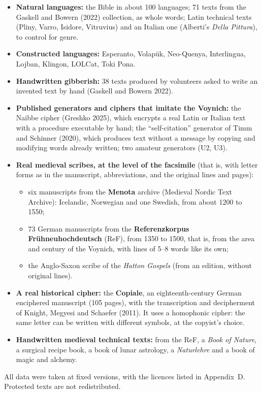 \begin{itemize}
\item \textbf{Natural languages:} the Bible in about 100 languages; 71 texts from the Gaskell and Bowern (2022)
  collection, as whole words; Latin technical texts (Pliny, Varro, Isidore, Vitruvius) and an Italian one (Alberti's
  \emph{Della Pittura}), to control for genre.
\item \textbf{Constructed languages:} Esperanto, Volapük, Neo-Quenya, Interlingua, Lojban, Klingon, LOLCat, Toki Pona.
\item \textbf{Handwritten gibberish:} 38 texts produced by volunteers asked to write an invented text by hand (Gaskell and
  Bowern 2022).
\item \textbf{Published generators and ciphers that imitate the Voynich:} the Naibbe cipher (Greshko 2025), which
  encrypts a real Latin or Italian text with a procedure executable by hand; the ``self-citation'' generator of Timm and
  Schinner (2020), which produces text without a message by copying and modifying words already written; two amateur
  generators (U2, U3).
\item \textbf{Real medieval scribes, at the level of the facsimile} (that is, with letter forms as in the manuscript,
  abbreviations, and the original lines and pages):
  \begin{itemize}
  \item six manuscripts from the \textbf{Menota} archive (Medieval Nordic Text Archive): Icelandic, Norwegian and one
    Swedish, from about 1200 to 1550;
  \item 73 German manuscripts from the \textbf{Referenzkorpus Frühneuhochdeutsch} (ReF), from 1350 to 1500, that is, from
    the area and century of the Voynich, with lines of 5--8 words like its own;
  \item the Anglo-Saxon scribe of the \emph{Hatton Gospels} (from an edition, without original lines).
  \end{itemize}
\item \textbf{A real historical cipher:} the \textbf{Copiale}, an eighteenth-century German enciphered manuscript (105
  pages), with the transcription and decipherment of Knight, Megyesi and Schaefer (2011). It uses a homophonic cipher:
  the same letter can be written with different symbols, at the copyist's choice.
\item \textbf{Handwritten medieval technical texts:} from the ReF, a \emph{Book of Nature}, a surgical recipe book, a
  book of lunar astrology, a \emph{Naturlehre} and a book of magic and alchemy.
\end{itemize}
All data were taken at fixed versions, with the licences listed in Appendix~D. Protected texts are not redistributed.

